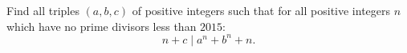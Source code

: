 Find all triples $(a,b,c)$ of positive integers such that for all positive integers $n$
which have no prime divisors less than $2015$:
$$n+c \mid a^n +b^n +n.$$
